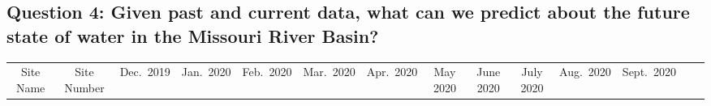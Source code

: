 \documentclass[12pt,]{article}
\begin{document}
\hypertarget{question-4-given-past-and-current-data-what-can-we-predict-about-the-future-state-of-water-in-the-missouri-river-basin}{%
\subsection{Question 4: Given past and current data, what can we predict
about the future state of water in the Missouri River
Basin?}\label{question-4-given-past-and-current-data-what-can-we-predict-about-the-future-state-of-water-in-the-missouri-river-basin}}

\begin{longtable}[]{@{}cccccccccccccc@{}}
\toprule
\begin{minipage}[b]{0.05\columnwidth}\centering
Site Name\strut
\end{minipage} & \begin{minipage}[b]{0.06\columnwidth}\centering
Site Number\strut
\end{minipage} & \begin{minipage}[b]{0.05\columnwidth}\centering
Dec.~2019\strut
\end{minipage} & \begin{minipage}[b]{0.04\columnwidth}\centering
Jan.~2020\strut
\end{minipage} & \begin{minipage}[b]{0.05\columnwidth}\centering
Feb.~2020\strut
\end{minipage} & \begin{minipage}[b]{0.05\columnwidth}\centering
Mar.~2020\strut
\end{minipage} & \begin{minipage}[b]{0.05\columnwidth}\centering
Apr.~2020\strut
\end{minipage} & \begin{minipage}[b]{0.04\columnwidth}\centering
May 2020\strut
\end{minipage} & \begin{minipage}[b]{0.05\columnwidth}\centering
June 2020\strut
\end{minipage} & \begin{minipage}[b]{0.05\columnwidth}\centering
July 2020\strut
\end{minipage} & \begin{minipage}[b]{0.05\columnwidth}\centering
Aug.~2020\strut
\end{minipage} & \begin{minipage}[b]{0.05\columnwidth}\centering
Sept.~2020\strut
\end{minipage} & \begin{minipage}[b]{0.04\columnwidth}\centering

\end{minipage}
\end{longtable}
\end{document}
